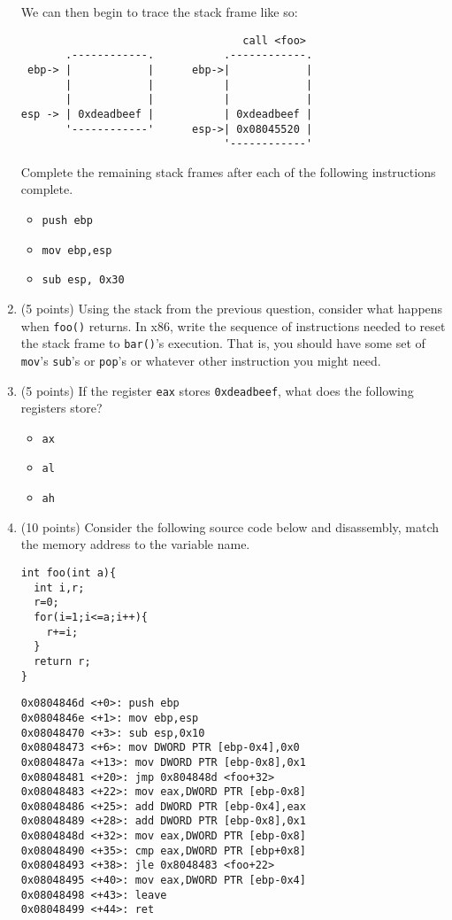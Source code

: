 \documentclass{article}[9pt]
\begin{document}
\begin{enumerate}
We can then begin to trace the stack frame like so:
\begin{verbatim}
                                   call <foo>
       .------------.           .------------.           
 ebp-> |            |      ebp->|            |
       |            |           |            |
       |            |           |            |
esp -> | 0xdeadbeef |           | 0xdeadbeef |
       '------------'      esp->| 0x08045520 |
                                '------------'
\end{verbatim}
 Complete the remaining stack frames after each of the following
instructions complete.

\begin{itemize}
\item \texttt{push ebp}
\item \texttt{mov ebp,esp}
\item \texttt{sub esp, 0x30}
\end{itemize}

\item (5 points) Using the stack from the previous question, consider what
happens when \texttt{foo()} returns. In x86, write the sequence of
instructions needed to reset the stack frame to \texttt{bar()}'s
execution. That is, you should have some set of \texttt{mov}'s \texttt{sub}'s
or \texttt{pop}'s or whatever other instruction you might need.

\item (5 points) If the register \texttt{eax} stores \texttt{0xdeadbeef}, what does the
following registers store?

\begin{itemize}
\item \texttt{ax}
\item \texttt{al}
\item \texttt{ah}
\end{itemize}

\item (10 points) Consider the following source code below and disassembly, match
the memory address to the variable name.

\begin{verbatim}
int foo(int a){
  int i,r;
  r=0;
  for(i=1;i<=a;i++){
    r+=i;
  }
  return r;
}
\end{verbatim}
\begin{verbatim}
0x0804846d <+0>: push ebp
0x0804846e <+1>: mov ebp,esp
0x08048470 <+3>: sub esp,0x10
0x08048473 <+6>: mov DWORD PTR [ebp-0x4],0x0
0x0804847a <+13>: mov DWORD PTR [ebp-0x8],0x1
0x08048481 <+20>: jmp 0x804848d <foo+32>
0x08048483 <+22>: mov eax,DWORD PTR [ebp-0x8]
0x08048486 <+25>: add DWORD PTR [ebp-0x4],eax
0x08048489 <+28>: add DWORD PTR [ebp-0x8],0x1
0x0804848d <+32>: mov eax,DWORD PTR [ebp-0x8]
0x08048490 <+35>: cmp eax,DWORD PTR [ebp+0x8]
0x08048493 <+38>: jle 0x8048483 <foo+22>
0x08048495 <+40>: mov eax,DWORD PTR [ebp-0x4]
0x08048498 <+43>: leave
0x08048499 <+44>: ret 
\end{verbatim}


\end{enumerate}
\end{document}

